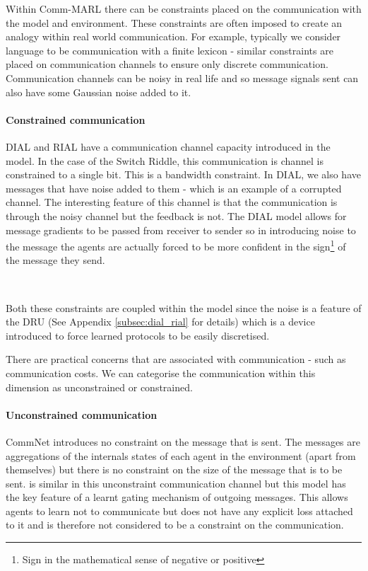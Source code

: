 \documentclass{article}
\begin{document}
Within Comm-MARL there can be constraints placed on the communication with the model and environment. These constraints are often imposed to create an analogy within real world communication. For example, typically we consider language to be communication with a finite lexicon - similar constraints are placed on communication channels to ensure only discrete communication. Communication channels can be noisy in real life and so message signals sent can also have some Gaussian noise added to it.

\paragraph{Constrained communication} DIAL and RIAL \citep{foerster2016learning} have a communication channel capacity introduced in the model. In the case of the Switch Riddle, this communication is channel is constrained to a single bit. This is a bandwidth constraint. In DIAL, we also have messages that have noise added to them - which is an example of a corrupted channel. The interesting feature of this channel is that the communication is through the noisy channel but the feedback is not. The DIAL model allows for message gradients to be passed from receiver to sender so in introducing noise to the message the agents are actually forced to be more confident in the sign\footnote{Sign in the mathematical sense of negative or positive} of the message they send.

\

Both these constraints are coupled within the model since the noise is a feature of the DRU (See Appendix \ref{subsec:dial_rial} for details) which is a device introduced to force learned protocols to be easily discretised. 

There are practical concerns that are associated with communication - such as communication costs. We can categorise the communication within this dimension as unconstrained or constrained. 

\paragraph{Unconstrained communication}
CommNet \citep{sukhbaatar2016commnet} introduces no constraint on the message that is sent. The messages are aggregations of the internals states of each agent in the environment (apart from themselves) but there is no constraint on the size of the message that is to be sent. \citet{singh2018ic3net} is similar in this unconstraint communication channel but this model has the key feature of a learnt gating mechanism of outgoing messages. This allows agents to learn not to communicate but does not have any explicit loss attached to it and is therefore not considered to be a constraint on the communication.
\end{document}
